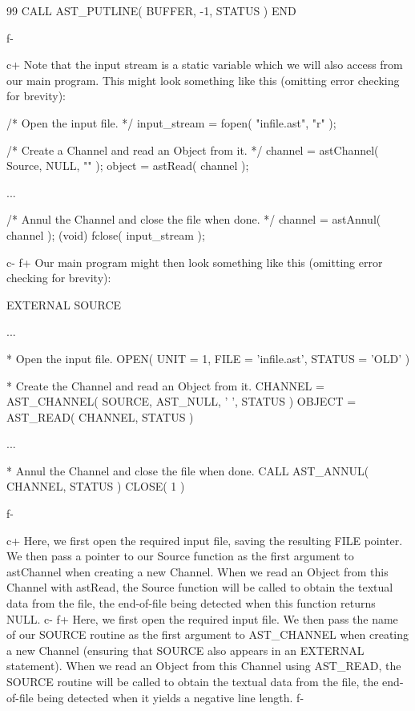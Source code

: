 \documentclass[twoside,11pt]{starlink}
\begin{document}
{\begin{terminalv}
 99   CALL AST_PUTLINE( BUFFER, -1, STATUS )
      END
\end{terminalv}
\normalsize
f-

c+
Note that the input stream is a static variable which we will also
access from our main program. This might look something like this
(omitting error checking for brevity):

\small
\begin{terminalv}
/* Open the input file. */
input_stream = fopen( "infile.ast", "r" );

/* Create a Channel and read an Object from it. */
channel = astChannel( Source, NULL, "" );
object = astRead( channel );

...

/* Annul the Channel and close the file when done. */
channel = astAnnul( channel );
(void) fclose( input_stream );
\end{terminalv}
\normalsize
c-
f+
Our main program might then look something like this (omitting error
checking for brevity):

\small
\begin{terminalv}
      EXTERNAL SOURCE

      ...

*  Open the input file.
      OPEN( UNIT = 1, FILE = 'infile.ast', STATUS = 'OLD' )

*  Create the Channel and read an Object from it.
      CHANNEL = AST_CHANNEL( SOURCE, AST_NULL, ' ', STATUS )
      OBJECT = AST_READ( CHANNEL, STATUS )

      ...

*  Annul the Channel and close the file when done.
      CALL AST_ANNUL( CHANNEL, STATUS )
      CLOSE( 1 )
\end{terminalv}
\normalsize
f-

c+
Here, we first open the required input file, saving the resulting FILE
pointer. We then pass a pointer to our Source function as the first
argument to astChannel when creating a new Channel. When we read
an Object from this Channel with astRead, the Source
function will be called to obtain the textual data from the file, the
end-of-file being detected when this function returns NULL.
c-
f+
Here, we first open the required input file.  We then pass the name of
our SOURCE routine as the first argument to AST\_CHANNEL when creating
a new Channel (ensuring that SOURCE also appears in an EXTERNAL
statement). When we read an Object from this Channel using
AST\_READ, the SOURCE routine will be called to obtain the textual
data from the file, the end-of-file being detected when it yields a
negative line length.
f-

}
\end{document}
